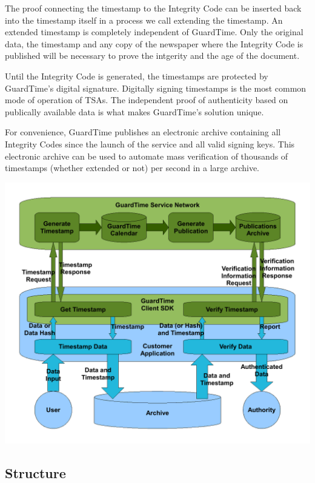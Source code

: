 The proof connecting the timestamp to the Integrity Code can be inserted back into the timestamp itself in a process we call extending the timestamp. An extended timestamp is completely independent of GuardTime. Only the original data, the timestamp and any copy of the newspaper where the Integrity Code is published will be necessary to prove the intgerity and the age of the document.

Until the Integrity Code is generated, the timestamps are protected by GuardTime's digital signature. Digitally signing timestamps is the most common mode of operation of TSAs. The independent proof of authenticity based on publically available data is what makes GuardTime's solution unique.

For convenience, GuardTime publishes an electronic archive containing all Integrity Codes since the launch of the service and all valid signing keys. This electronic archive can be used to automate mass verification of thousands of timestamps (whether extended or not) per second in a large archive.

 
\begin{DoxyImageNoCaption}
  \mbox{\includegraphics[width=15cm]{TspOverview}}
\end{DoxyImageNoCaption}


\subsection*{Structure}

